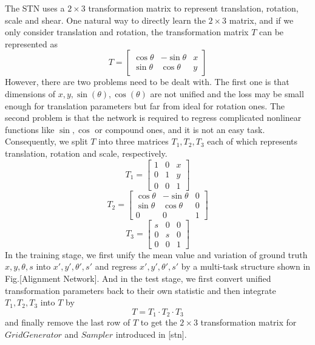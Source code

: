 \documentclass[10pt,conference,a4paper]{IEEEtran}
\begin{document}
	The STN uses a $2 \times 3$ transformation matrix to represent translation, rotation, scale and shear. One natural way to directly learn the $2 \times 3$ matrix, and if we only consider translation and rotation, the transformation matrix $T$ can be represented as 
	\begin{equation}
		T = 
		\begin{bmatrix}
		\cos\theta & -\sin\theta & x\\ 
		\sin\theta & \cos\theta & y
		\end{bmatrix}
	\end{equation}
	However, there are two problems need to be dealt with. The first one is that dimensions of $x, y, \sin(\theta), \cos(\theta)$ are not unified and the loss may be small enough for translation parameters but far from ideal for rotation ones. The second problem is that the network is required to regress complicated nonlinear functions like $\sin, \cos$ or compound ones, and it is not an easy task. Consequently, we split $T$ into three matrices $T_1, T_2, T_3$ each of which represents translation, rotation and scale, respectively.
	\begin{equation}
		T_1 = 
		\begin{bmatrix}
		1 & 0 & x\\
		0 & 1 & y\\
		0 & 0 & 1
		\end{bmatrix}
	\end{equation}
	\begin{equation}
		T_2 = 
		\begin{bmatrix}
		\cos\theta & -\sin\theta & 0\\
		\sin\theta & \cos\theta & 0\\
		0 & 0 & 1
		\end{bmatrix}
	\end{equation}
	\begin{equation}
	T_3 = 
	\begin{bmatrix}
	s & 0 & 0\\
	0 & s & 0\\
	0 & 0 & 1
	\end{bmatrix}
	\end{equation}
	In the training stage, we first unify the mean value and variation of ground truth $x, y, \theta, s$ into $x', y', \theta', s'$ and regress $x', y', \theta', s'$ by a multi-task structure shown in Fig.[Alignment Network]. And in the test stage, we first convert unified transformation parameters back to their own statistic and then integrate $T_1, T_2, T_3$ into $T$ by
	\begin{equation}
		T = T_1 \cdot T_2 \cdot T_3
	\end{equation}
	and finally remove the last row of $T$ to get the $2 \times 3$ transformation matrix for $Grid Generator$ and $Sampler$ introduced in [stn].
		
\end{document}
